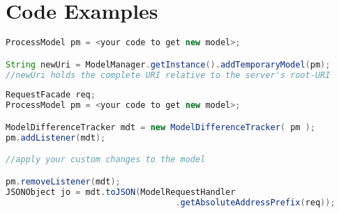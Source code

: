 \section{Code Examples}
\label{code_examples}

\begin{lstlisting}[language=Java, label=newtmp, caption=Add a new temporary model to the model manager]
ProcessModel pm = <your code to get new model>;

String newUri = ModelManager.getInstance().addTemporaryModel(pm);
//newUri holds the complete URI relative to the server's root-URI
\end{lstlisting}

\begin{lstlisting}[language=Java, label=mdt, caption=Track model changes and create model difference JSON]
RequestFacade req;
ProcessModel pm = <your code to get new model>;

ModelDifferenceTracker mdt = new ModelDifferenceTracker( pm );
pm.addListener(mdt);

//apply your custom changes to the model

pm.removeListener(mdt);
JSONObject jo = mdt.toJSON(ModelRequestHandler
		                          .getAbsoluteAddressPrefix(req));
\end{lstlisting}